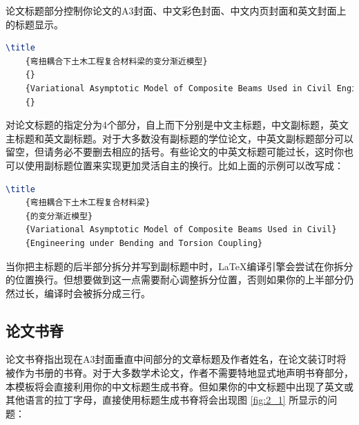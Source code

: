 论文标题部分控制你论文的A3封面、中文彩色封面、中文内页封面和英文封面上的标题显示。

\begin{tcolorbox}
\begin{lstlisting}[language=TeX]
\title
    {弯扭耦合下土木工程复合材料梁的变分渐近模型}
    {}
    {Variational Asymptotic Model of Composite Beams Used in Civil Engineering under Bending and Torsion Coupling}
    {}
\end{lstlisting}
\end{tcolorbox}

\noindent 对论文标题的指定分为4个部分，自上而下分别是中文主标题，中文副标题，英文主标题和英文副标题。对于大多数没有副标题的学位论文，中英文副标题部分可以留空，但请务必不要删去相应的括号。有些论文的中英文标题可能过长，这时你也可以使用副标题位置来实现更加灵活自主的换行。比如上面的示例可以改写成：

\begin{tcolorbox}
\begin{lstlisting}[language=TeX]
\title
    {弯扭耦合下土木工程复合材料梁}
    {的变分渐近模型}
    {Variational Asymptotic Model of Composite Beams Used in Civil}
    {Engineering under Bending and Torsion Coupling}
\end{lstlisting}
\end{tcolorbox}

\noindent 当你把主标题的后半部分拆分并写到副标题中时，\LaTeX 编译引擎会尝试在你拆分的位置换行。但想要做到这一点需要耐心调整拆分位置，否则如果你的上半部分仍然过长，编译时会被拆分成三行。

\subsection{论文书脊}

论文书脊指出现在A3封面垂直中间部分的文章标题及作者姓名，在论文装订时将被作为书册的书脊。对于大多数学术论文，作者不需要特地显式地声明书脊部分，本模板将会直接利用你的中文标题生成书脊。但如果你的中文标题中出现了英文或其他语言的拉丁字母，直接使用标题生成书脊将会出现图 \ref{fig:2_1} 所显示的问题：


